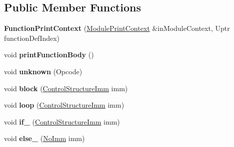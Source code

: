 \subsection*{Public Member Functions}
\begin{DoxyCompactItemize}
\item 
\mbox{\label{struct_w_a_s_t_1_1_function_print_context_a38488c964e7ef665b2e485ca2e3e9f52}} 
{\bfseries Function\+Print\+Context} (\mbox{\hyperlink{struct_w_a_s_t_1_1_module_print_context}{Module\+Print\+Context}} \&in\+Module\+Context, Uptr function\+Def\+Index)
\item 
\mbox{\label{struct_w_a_s_t_1_1_function_print_context_ac804dcf13cf02cabd52df00efa296f5c}} 
void {\bfseries print\+Function\+Body} ()
\item 
\mbox{\label{struct_w_a_s_t_1_1_function_print_context_a8b81bbbea58402bd37654b3e354a9ff7}} 
void {\bfseries unknown} (Opcode)
\item 
\mbox{\label{struct_w_a_s_t_1_1_function_print_context_a695c2391775ff27c347985cac4039662}} 
void {\bfseries block} (\mbox{\hyperlink{struct_i_r_1_1_control_structure_imm}{Control\+Structure\+Imm}} imm)
\item 
\mbox{\label{struct_w_a_s_t_1_1_function_print_context_a90085bbb13f4db39aac326acad58078d}} 
void {\bfseries loop} (\mbox{\hyperlink{struct_i_r_1_1_control_structure_imm}{Control\+Structure\+Imm}} imm)
\item 
\mbox{\label{struct_w_a_s_t_1_1_function_print_context_a5720bdc046ad8f39b8e26445de9f33b5}} 
void {\bfseries if\+\_\+} (\mbox{\hyperlink{struct_i_r_1_1_control_structure_imm}{Control\+Structure\+Imm}} imm)
\item 
\mbox{\label{struct_w_a_s_t_1_1_function_print_context_aea960362623c3861fad99a1f7d32a4ac}} 
void {\bfseries else\+\_\+} (\mbox{\hyperlink{struct_i_r_1_1_no_imm}{No\+Imm}} imm)
\item 
\mbox{\label{struct_w_a_s_t_1_1_function_print_context_a61939fd252313f967504761af8c74542}} 

\end{DoxyCompactItemize}
